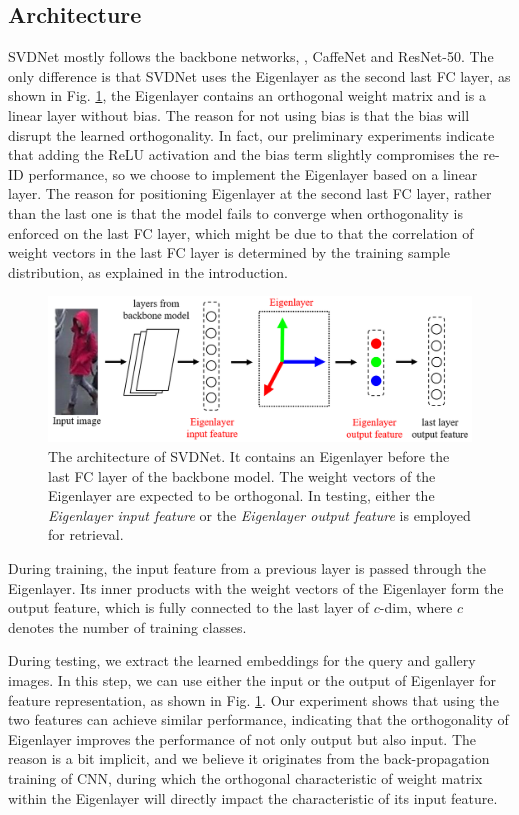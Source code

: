 \documentclass[10pt,twocolumn,letterpaper]{article}
\begin{document}
\subsection{Architecture} \label{sec:architecture}
SVDNet mostly follows the backbone networks, \eg, CaffeNet and ResNet-50. The only difference is that SVDNet uses the Eigenlayer as the second last FC layer, as shown in Fig. \ref{fig:svdnet}, the Eigenlayer contains an orthogonal weight matrix and is a linear layer without bias. The reason for not using bias is that the bias will disrupt the learned orthogonality. In fact, our preliminary experiments indicate that adding the ReLU activation and the bias term slightly compromises the re-ID performance, so we choose to implement the Eigenlayer based on a linear layer. The reason for positioning Eigenlayer at the second last FC layer, rather than the last one is that the model fails to converge when orthogonality is enforced on the last FC layer, which might be due to that the correlation of weight vectors in the last FC layer is determined by the training sample distribution, as explained in the introduction.
\begin{figure}[t]
\begin{center}
\includegraphics[width=1\linewidth]{architecture.PNG}
\end{center}
\setlength{\abovecaptionskip}{0cm} 
   \caption{The architecture of SVDNet. It contains an Eigenlayer before the last FC layer of the backbone model. The weight vectors of the Eigenlayer are expected to be orthogonal. In testing, either the \emph{Eigenlayer input feature} or the \emph{Eigenlayer output feature} is employed for retrieval.} 
\label{fig:svdnet}
\end{figure}
During training, the input feature from a previous layer is passed through the Eigenlayer. Its inner products with the weight vectors of the Eigenlayer form the output feature, which is fully connected to the last layer of $c$-dim, where $c$ denotes the number of training classes. 

During testing, we extract the learned embeddings for the query and gallery images. In this step, we can use either the input or the output of Eigenlayer for feature representation, as shown in Fig. \ref{fig:svdnet}. Our experiment shows that using the two features can achieve similar performance, indicating that the orthogonality of Eigenlayer improves the performance of not only output but also input. The reason is a bit implicit, and we believe it originates from the back-propagation training of CNN, during which the orthogonal characteristic of weight matrix within the Eigenlayer will directly impact the characteristic of its input feature.  
\end{document}
